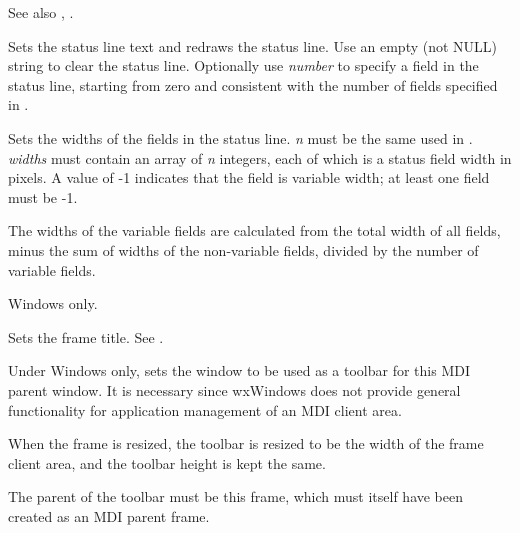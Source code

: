 See also , .

\label{wxframesetstatustext}


Sets the status line text and redraws the status line. Use an empty (not NULL) string
to clear the status line. Optionally use {\it number} to specify a
field in the status line, starting from zero and consistent with the number
of fields specified in .

\label{wxframesetstatuswidths}


Sets the widths of the fields in the status line. {\it n} must be the
same used in . {\it widths} must
contain an array of {\it n} integers, each of which is a status field width
in pixels. A value of -1 indicates that the field is variable width; at least one
field must be -1.

The widths of the variable fields are calculated from the total width of all fields,
minus the sum of widths of the non-variable fields, divided by the number of 
variable fields.

Windows only.

\label{wxframesettitle}


Sets the frame title. See .

\label{wxframesettoolbar}


Under Windows only, sets the window to be used as a toolbar for this
MDI parent window. It is necessary since wxWindows does not provide
general functionality for application management of an MDI client area.

When the frame is resized, the toolbar is resized to be the width of
the frame client area, and the toolbar height is kept the same.

The parent of the toolbar must be this frame, which must itself have
been created as an MDI parent frame.

